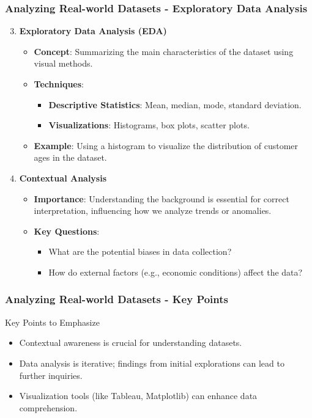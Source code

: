 \documentclass[aspectratio=169]{beamer}
\begin{document}
\begin{frame}[fragile]
    \frametitle{Analyzing Real-world Datasets - Exploratory Data Analysis}
    \begin{enumerate}
        \setcounter{enumi}{2}
        \item \textbf{Exploratory Data Analysis (EDA)}
            \begin{itemize}
                \item \textbf{Concept}: Summarizing the main characteristics of the dataset using visual methods.
                \item \textbf{Techniques}:
                    \begin{itemize}
                        \item \textbf{Descriptive Statistics}: Mean, median, mode, standard deviation.
                        \item \textbf{Visualizations}: Histograms, box plots, scatter plots.
                    \end{itemize}
                \item \textbf{Example}: Using a histogram to visualize the distribution of customer ages in the dataset.
            \end{itemize}

        \item \textbf{Contextual Analysis}
            \begin{itemize}
                \item \textbf{Importance}: Understanding the background is essential for correct interpretation, influencing how we analyze trends or anomalies.
                \item \textbf{Key Questions}:
                    \begin{itemize}
                        \item What are the potential biases in data collection?
                        \item How do external factors (e.g., economic conditions) affect the data?
                    \end{itemize}
            \end{itemize}
    \end{enumerate}
\end{frame}

\begin{frame}[fragile]
    \frametitle{Analyzing Real-world Datasets - Key Points}
    \begin{block}{Key Points to Emphasize}
        \begin{itemize}
            \item Contextual awareness is crucial for understanding datasets.
            \item Data analysis is iterative; findings from initial explorations can lead to further inquiries.
            \item Visualization tools (like Tableau, Matplotlib) can enhance data comprehension.
        \end{itemize}
    \end{block}
\end{frame}
\end{document}
